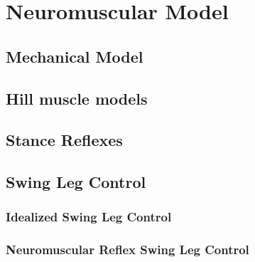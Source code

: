 \chapter{Neuromuscular Model}

\section{Mechanical Model}
\section{Hill muscle models}
\section{Stance Reflexes}
\section{Swing Leg Control}
\subsection{Idealized Swing Leg Control}
\subsection{Neuromuscular Reflex Swing Leg Control}
